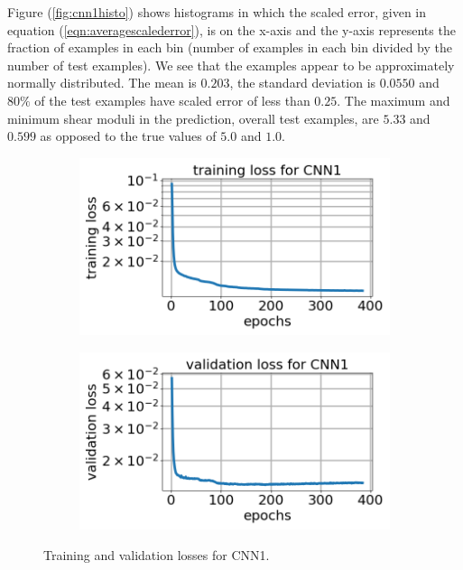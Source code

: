 \documentclass[12pt]{article}
\newcommand{\nhglossheight}{4cm}
\newcommand{\nhglosswidth}{0.48\linewidth}
\begin{document}
Figure (\ref{fig:cnn1histo}) shows histograms in which the scaled error, given in equation (\ref{eqn:averagescalederror}), is on the x-axis and the y-axis represents the fraction of examples in each bin (number of examples in each bin divided by the number of test examples). We see that the examples appear to be approximately normally distributed. The mean is $0.203$, the standard deviation is $0.0550$ and $80\%$ of the test examples have scaled error of less than $0.25$. The maximum and minimum shear moduli in the prediction, overall test examples, are $5.33$ and $0.599$ as opposed to the true values of $5.0$ and $1.0$. 
\begin{figure}[!h]
  \centering
  \begin{subfigure}[c]{\nhglosswidth}
    \centering
    \includegraphics[totalheight=\nhglossheight]{Figures/Results1New/loss_cnn1_new.png}
  \end{subfigure}
%  
  \begin{subfigure}[c]{\nhglosswidth}
    \centering    
    \includegraphics[totalheight=\nhglossheight]{Figures/Results1New/val_loss_cnn1_new.png}
  \end{subfigure}
  \caption{\label{fig:cnn1losses} Training and validation losses for CNN1.}
\end{figure}
\end{document}
